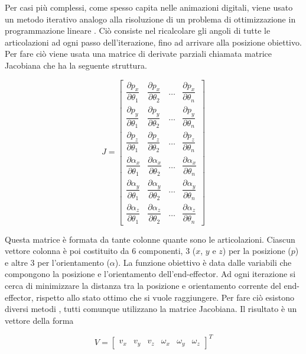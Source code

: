 Per casi più complessi, come spesso capita nelle animazioni digitali, viene usato un metodo iterativo  analogo alla risoluzione di un problema di ottimizzazione in programmazione lineare \cite{lp2017}.
Ciò consiste nel ricalcolare gli angoli di tutte le articolazioni ad ogni passo dell'iterazione, fino ad arrivare alla posizione obiettivo.
Per fare ciò viene usata una matrice di derivate parziali chiamata matrice Jacobiana \cite{Parent:2012:CAA:2385444} che ha la seguente struttura.

\[J=
\begin{bmatrix}
    \dfrac{\partial p_x}{\partial \theta_1} & \dfrac{\partial p_x}{\partial \theta_2} & \dots & \dfrac{\partial p_x}{\partial \theta_n} \\[2ex]
    \dfrac{\partial p_y}{\partial \theta_1} & \dfrac{\partial p_y}{\partial \theta_2} & \dots & \dfrac{\partial p_y}{\partial \theta_n} \\[2ex]
    \dfrac{\partial p_z}{\partial \theta_1} & \dfrac{\partial p_z}{\partial \theta_2} & \dots & \dfrac{\partial p_z}{\partial \theta_n} \\[2ex]
    \dfrac{\partial \alpha_x}{\partial \theta_1} & \dfrac{\partial \alpha_x}{\partial \theta_2} & \dots & \dfrac{\partial \alpha_x}{\partial \theta_n} \\[2ex]
    \dfrac{\partial \alpha_y}{\partial \theta_1} & \dfrac{\partial \alpha_y}{\partial \theta_2} & \dots & \dfrac{\partial \alpha_y}{\partial \theta_n} \\[2ex]
    \dfrac{\partial \alpha_z}{\partial \theta_1} & \dfrac{\partial \alpha_z}{\partial \theta_2} & \dots & \dfrac{\partial \alpha_z}{\partial \theta_n} 
\end{bmatrix}
\]

Questa matrice è formata da tante colonne quante sono le articolazioni. Ciascun vettore colonna è poi costituito da 6 componenti, 3 ($x$, $y$ e $z$) per la posizione ($p$) e altre 3 per l'orientamento ($\alpha$).
La funzione obiettivo è data dalle variabili che compongono la posizione e l'orientamento dell'end-effector.
Ad ogni iterazione si cerca di minimizzare la distanza tra la posizione e orientamento corrente del end-effector, rispetto allo stato ottimo che si vuole raggiungere.
Per fare ciò esistono diversi metodi \cite{simplex2011, simplex2006} \cite{mingozR2019} \cite{mingozD2019}, tutti comunque utilizzano la matrice Jacobiana.
Il risultato è un vettore della forma

\[V=
\begin{bmatrix}
v_x & v_y & v_z & \omega_x & \omega_y & \omega_z
\end{bmatrix}
^T\]    

